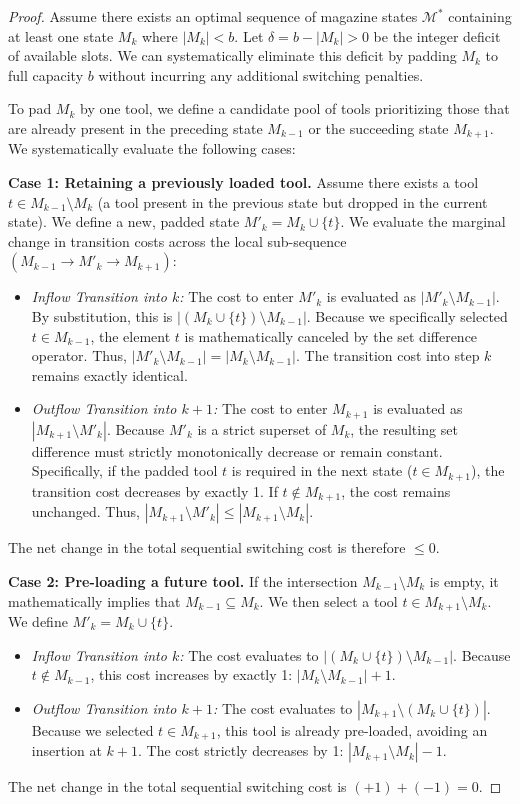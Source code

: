 \documentclass[11pt, a4paper]{book}
\begin{document}
	\begin{proof}
		Assume there exists an optimal sequence of magazine states $\mathcal{M}^*$ containing at least one state $M_k$ where $|M_k| < b$. Let $\delta = b - |M_k| > 0$ be the integer deficit of available slots. We can systematically eliminate this deficit by padding $M_k$ to full capacity $b$ without incurring any additional switching penalties.
		
		To pad $M_k$ by one tool, we define a candidate pool of tools prioritizing those that are already present in the preceding state $M_{k-1}$ or the succeeding state $M_{k+1}$. We systematically evaluate the following cases:
		
		\textbf{Case 1: Retaining a previously loaded tool.}
		Assume there exists a tool $t \in M_{k-1} \setminus M_k$ (a tool present in the previous state but dropped in the current state). We define a new, padded state $M'_k = M_k \cup \{t\}$. 
		We evaluate the marginal change in transition costs across the local sub-sequence $(M_{k-1} \to M'_k \to M_{k+1})$:
		\begin{itemize}
			\item \textit{Inflow Transition into $k$:} The cost to enter $M'_k$ is evaluated as $|M'_k \setminus M_{k-1}|$. By substitution, this is $|(M_k \cup \{t\}) \setminus M_{k-1}|$. Because we specifically selected $t \in M_{k-1}$, the element $t$ is mathematically canceled by the set difference operator. Thus, $|M'_k \setminus M_{k-1}| = |M_k \setminus M_{k-1}|$. The transition cost into step $k$ remains exactly identical.
			\item \textit{Outflow Transition into $k+1$:} The cost to enter $M_{k+1}$ is evaluated as $|M_{k+1} \setminus M'_k|$. Because $M'_k$ is a strict superset of $M_k$, the resulting set difference must strictly monotonically decrease or remain constant. Specifically, if the padded tool $t$ is required in the next state ($t \in M_{k+1}$), the transition cost decreases by exactly 1. If $t \notin M_{k+1}$, the cost remains unchanged. Thus, $|M_{k+1} \setminus M'_k| \le |M_{k+1} \setminus M_k|$.
		\end{itemize}
		The net change in the total sequential switching cost is therefore $\le 0$.
		
		\textbf{Case 2: Pre-loading a future tool.}
		If the intersection $M_{k-1} \setminus M_k$ is empty, it mathematically implies that $M_{k-1} \subseteq M_k$. We then select a tool $t \in M_{k+1} \setminus M_k$. We define $M'_k = M_k \cup \{t\}$.
		\begin{itemize}
			\item \textit{Inflow Transition into $k$:} The cost evaluates to $|(M_k \cup \{t\}) \setminus M_{k-1}|$. Because $t \notin M_{k-1}$, this cost increases by exactly 1: $|M_k \setminus M_{k-1}| + 1$.
			\item \textit{Outflow Transition into $k+1$:} The cost evaluates to $|M_{k+1} \setminus (M_k \cup \{t\})|$. Because we selected $t \in M_{k+1}$, this tool is already pre-loaded, avoiding an insertion at $k+1$. The cost strictly decreases by 1: $|M_{k+1} \setminus M_k| - 1$.
		\end{itemize}
		The net change in the total sequential switching cost is $(+1) + (-1) = 0$.
		

\end{proof}
\end{document}
